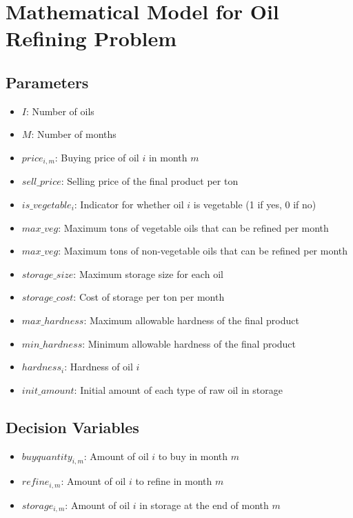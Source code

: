 \documentclass{article}
\begin{document}
\section*{Mathematical Model for Oil Refining Problem}

\subsection*{Parameters}
\begin{itemize}
    \item $I$: Number of oils
    \item $M$: Number of months
    \item $price_{i,m}$: Buying price of oil $i$ in month $m$
    \item $sell\_price$: Selling price of the final product per ton
    \item $is\_vegetable_i$: Indicator for whether oil $i$ is vegetable (1 if yes, 0 if no)
    \item $max\_veg$: Maximum tons of vegetable oils that can be refined per month
    \item $max\_veg$: Maximum tons of non-vegetable oils that can be refined per month
    \item $storage\_size$: Maximum storage size for each oil
    \item $storage\_cost$: Cost of storage per ton per month
    \item $max\_hardness$: Maximum allowable hardness of the final product
    \item $min\_hardness$: Minimum allowable hardness of the final product
    \item $hardness_i$: Hardness of oil $i$
    \item $init\_amount$: Initial amount of each type of raw oil in storage
\end{itemize}

\subsection*{Decision Variables}
\begin{itemize}
    \item $buyquantity_{i,m}$: Amount of oil $i$ to buy in month $m$ 
    \item $refine_{i,m}$: Amount of oil $i$ to refine in month $m$ 
    \item $storage_{i,m}$: Amount of oil $i$ in storage at the end of month $m$
\end{itemize}
\end{document}
